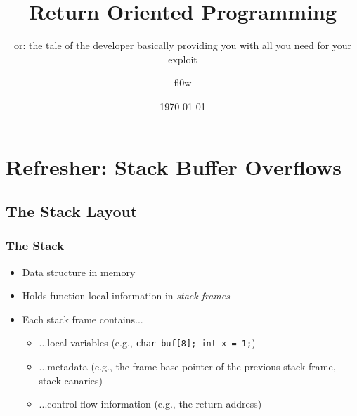 \documentclass[aspectratio=169]{beamer}
\title{Return Oriented Programming}
\subtitle{or: the tale of the developer basically providing you with all you
    need for your exploit}
\author{fl0w}
\date{\today}
\begin{document}
\titleframe

\tocframe

\section{Refresher: Stack Buffer Overflows}

\subsection{The Stack Layout}

\begin{frame}
    \frametitle{The Stack}
    \begin{itemize}
        \item Data structure in memory
        \item Holds function-local information in \emph{stack frames}
        \item Each stack frame contains...
            \begin{itemize}
                \item ...local variables (e.g., \texttt{char buf[8]; int
                    x = 1;})
                \item ...metadata (e.g., the frame base pointer of the previous
                    stack frame, stack canaries)
                \item ...control flow information (e.g., the return address)
            \end{itemize}
    \end{itemize}
\end{frame}
\end{document}
